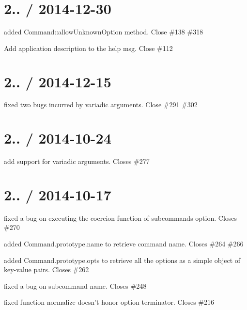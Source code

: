 \section*{2.. / 2014-\/12-\/30 }


\begin{DoxyItemize}
\item added {\ttfamily Command\+::allow\+Unknown\+Option} method. Close \#138 \#318  
\item Add application description to the help msg. Close \#112 
\end{DoxyItemize}

\section*{2.. / 2014-\/12-\/15 }


\begin{DoxyItemize}
\item fixed two bugs incurred by variadic arguments. Close \#291  \#302 
\end{DoxyItemize}

\section*{2.. / 2014-\/10-\/24 }


\begin{DoxyItemize}
\item add support for variadic arguments. Closes \#277 
\end{DoxyItemize}

\section*{2.. / 2014-\/10-\/17 }


\begin{DoxyItemize}
\item fixed a bug on executing the coercion function of subcommands option. Closes \#270
\item added {\ttfamily Command.\+prototype.\+name} to retrieve command name. Closes \#264 \#266 
\item added {\ttfamily Command.\+prototype.\+opts} to retrieve all the options as a simple object of key-\/value pairs. Closes \#262 
\item fixed a bug on subcommand name. Closes \#248 
\item fixed function normalize doesn’t honor option terminator. Closes \#216 
\end{DoxyItemize}

